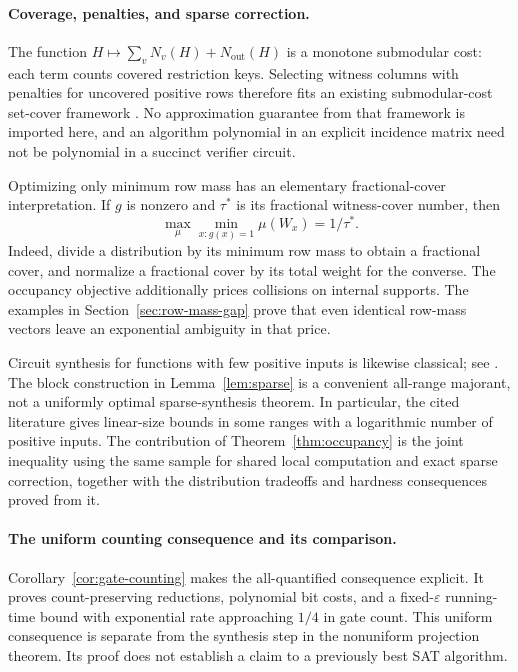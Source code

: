 \paragraph{Coverage, penalties, and sparse correction.}
The function $H\mapsto\sum_vN_v(H)+N_{\mathrm{out}}(H)$ is a
monotone submodular cost: each term counts covered restriction keys.
Selecting witness columns with penalties for uncovered positive rows
therefore fits an existing submodular-cost set-cover framework
\citep{Wang2015}. No approximation guarantee from that framework
is imported here, and an algorithm polynomial in an explicit incidence
matrix need not be polynomial in a succinct verifier circuit.

Optimizing only minimum row mass has an elementary fractional-cover
interpretation. If $g$ is nonzero and $\tau^*$ is its fractional
witness-cover number, then
\[
 \max_\mu\min_{x:g(x)=1}\mu(W_x)=1/\tau^*.
\]
Indeed, divide a distribution by its minimum row mass to obtain a
fractional cover, and normalize a fractional cover by its total weight
for the converse. The occupancy objective additionally prices
collisions on internal supports. The examples in
Section~\ref{sec:row-mass-gap} prove that even identical row-mass
vectors leave an exponential ambiguity in that price.

Circuit synthesis for functions with few positive inputs is likewise
classical; see \citet{Redkin2004,Redkin2021}. The block construction
in Lemma~\ref{lem:sparse} is a convenient all-range majorant, not a
uniformly optimal sparse-synthesis theorem. In particular, the cited
literature gives linear-size bounds in some ranges with a logarithmic
number of positive inputs. The contribution of
Theorem~\ref{thm:occupancy} is the joint inequality using the same
sample for shared local computation and exact sparse correction,
together with the distribution tradeoffs and hardness consequences
proved from it.

\paragraph{The uniform counting consequence and its comparison.}
Corollary~\ref{cor:gate-counting} makes the all-quantified consequence
explicit. It proves count-preserving reductions, polynomial bit costs,
and a fixed-$\varepsilon$ running-time bound with exponential rate
approaching $1/4$ in gate count. This uniform consequence is separate
from the synthesis step in the nonuniform projection theorem.
Its proof does not establish a claim to a previously best SAT algorithm.

